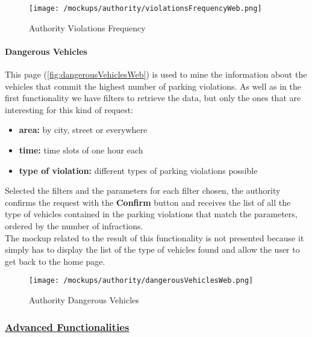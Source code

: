 				\begin{figure}[ht!]
					\centering
					\texttt{[image: /mockups/authority/violationsFrequencyWeb.png]}
					\caption{\label{fig:violationsFrequencyWeb} Authority Violations Frequency}
				\end{figure}
				
				\paragraph{Dangerous Vehicles}
				This page (\autoref{fig:dangerousVehiclesWeb}) is used to mine the information about the vehicles that commit the highest number of parking violations. As well as in the first functionality we have filters to retrieve the data, but only the ones that are interesting for this kind of request:
				
				\begin{itemize}
					\item \textbf{area:} by city, street or everywhere
					\item \textbf{time:} time slots of one hour each
					\item \textbf{type of violation:} different types of parking violations possible
				\end{itemize}
			
				Selected the filters and the parameters for each filter chosen, the authority confirms the request with the \textbf{Confirm} button and receives the list of all the type of vehicles contained in the parking violations that match the parameters, ordered by the number of infractions.\\
				
				The mockup related to the result of this functionality is not presented because it simply has to display the list of the type of vehicles found and allow the user to get back to the home page.
				
				 \vspace{0.6cm}
				
				\begin{figure}[ht!]
					\centering
					\texttt{[image: /mockups/authority/dangerousVehiclesWeb.png]}
					\caption{\label{fig:dangerousVehiclesWeb} Authority Dangerous Vehicles}
				\end{figure}
			
			\subsubsection[Advanced Functionalities]{\hyperlink{toc}{Advanced Functionalities}}
				\label{sec:authorityAdvancedFunctioalites}
				
